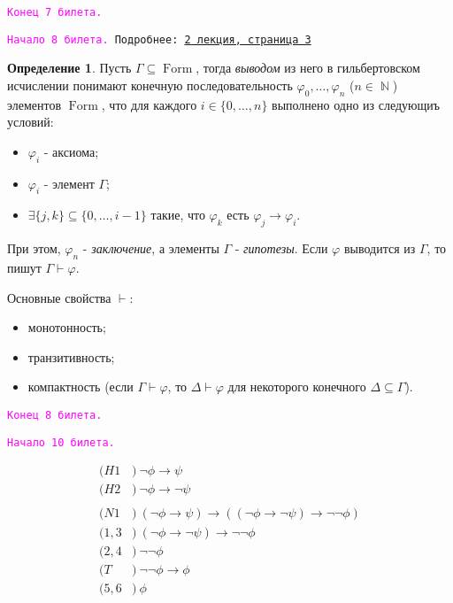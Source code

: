 \documentclass[a4paper,100pt]{article}
\theoremstyle{indented}
\theoremstyle{definition}
\newtheorem{defn}{Определение}
\theoremstyle{remark}
\DeclareMathOperator{\NN}{\mathbb{N}}
\DeclareMathOperator{\form}{Form}
\begin{document}
\texttt{\textcolor{magenta}{Конец 7 билета.}} 

\hrulefill

\texttt{\hypertarget{b8}{\textcolor{magenta}{Начало 8 билета.}} Подробнее: \href{http://www.mi-ras.ru/~speranski/courses/logic-1-2021-spring/slides_2.pdf}{2 лекция, страница 3}} 

\begin{defn}
  Пусть $\Gamma \subseteq \form$, тогда \textit{выводом} из него в гильбертовском исчислении понимают конечную последовательность $\varphi_0, \ldots, \varphi_n$ ($n\in \NN$) элементов $\form$, что для каждого $i\in\{0, \ldots, n\}$ выполнено одно из следующиъ условий: 

  \begin{itemize}
    \item $\varphi_i$ - аксиома; 
    \item $\varphi_i$ - элемент $\Gamma$; 
    \item $\exists \{j, k\}\subseteq\{0, \ldots, i-1\}$ такие, что $\varphi_k$ есть $\varphi_j\rightarrow \varphi_i$. 
  \end{itemize}
  При этом, $\varphi_n$ - \textit{заключение}, а элементы $\Gamma$ - \textit{гипотезы}. Если $\varphi$ выводится из $\Gamma$, то пишут $\Gamma \vdash \varphi$. 
\end{defn}

Основные свойства $\vdash$:

\begin{itemize}
  \item монотонность; 
  \item транзитивность;
  \item компактность (если $\Gamma \vdash \varphi$, то $\Delta \vdash \varphi$ для некоторого конечного $\Delta \subseteq \Gamma$).
\end{itemize}

\texttt{\textcolor{magenta}{Конец 8 билета.}} 

\hrulefill

\texttt{\hypertarget{b10}{\textcolor{magenta}{Начало 10 билета.}}} 

\begin{align*}
  (H1 &) \: \neg\phi\to\psi\\
  (H2 &) \: \neg\phi\to\neg\psi\\
  \\
  (N1 &) \: (\neg\phi\to\psi)\to((\neg\phi\to\neg\psi)\to\neg\neg\phi)\\
  (1, 3 &) \: (\neg\phi\to\neg\psi)\to\neg\neg\phi\\
  (2, 4 &) \: \neg\neg\phi\\
  (T &) \: \neg\neg\phi\to\phi\\
  (5, 6 &) \: \phi
\end{align*}
\end{document}
